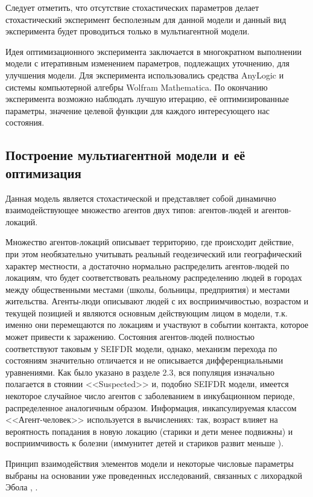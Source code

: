 Следует отметить, что отсутствие стохастических параметров делает стохастический эксперимент бесполезным для данной модели и данный вид эксперимента будет проводиться только в мультиагентной модели.

Идея  оптимизационного  эксперимента заключается в многократном выполнении модели с итеративным изменением параметров, подлежащих уточнению, для улучшения модели. Для эксперимента использовались средства AnyLogic  и системы компьютерной алгебры Wolfram Mathematica. По окончанию эксперимента возможно наблюдать лучшую итерацию, её оптимизированные параметры, значение целевой функции для каждого интересующего нас состояния.

\subsection{Построение мультиагентной модели и её оптимизация}

Данная модель является стохастической и  представляет собой динамично взаимодействующее множество агентов двух типов: агентов-людей и агентов-локаций. 

Множество агентов-локаций описывает территорию, где происходит действие, при этом необязательно учитывать реальный геодезический или географический характер местности, а достаточно нормально распределить агентов-людей по локациям, что будет соответствовать реальному распределению людей в городах между общественными местами (школы, больницы, предприятия) и местами жительства.    Агенты-люди описывают людей с их восприимчивостью, возрастом и текущей позицией и являются основным действующим лицом в модели,  т.к. именно они перемещаются по локациям и участвуют в событии контакта, которое может привести к заражению. Состояния агентов-людей полностью соответствуют таковым у SEIFDR модели, однако, механизм перехода по состояниям значительно отличается и не описывается дифференциальными уравнениями. Как было указано в разделе 2.3, вся популяция изначально полагается в стоянии  <<Suspected>> и, подобно SEIFDR модели, имеется некоторое случайное число агентов с заболеванием в инкубационном периоде, распределенное аналогичным образом. Информация, инкапсулируемая классом <<Агент-человек>> используется в вычислениях: так, возраст влияет на вероятность попадания в новую локацию (старики и дети менее подвижны) и восприимчивость к болезни (иммунитет детей и стариков развит меньше %
\cite{Parahonsky:2011}).

Принцип взаимодействия элементов модели и некоторые числовые параметры выбраны на основании уже проведенных исследований, связанных с лихорадкой Эбола
\cite{Plos_Outbreak:1}, \cite{Plos_Outbreak:2}. 

